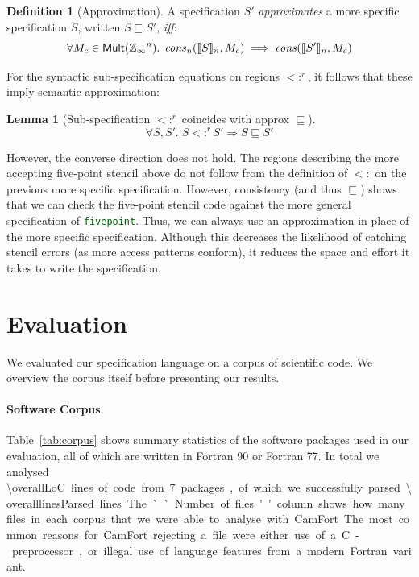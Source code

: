 \documentclass[9pt,preprint]{sigplanconf}
\newcounter{block}
\newtheorem{lemma}[block]{Lemma}
\theoremstyle{definition}
\newtheorem{definition}[block]{Definition}
\newcommand{\interp}[1]{\llbracket{#1}\rrbracket}
\newcommand{\term}[1]{\texttt{#1}}
\begin{document}
\begin{definition}[Approximation]
A specification $S'$
\emph{approximates} a more specific specification $S$, written 
$S \sqsubseteq S'$, \emph{iff}:
$$
\forall M_c \in \textsf{Mult}(\domainVal{}^n) . \;\, \mathit{cons}_n(\interp{S}_n,M_c) \implies
\mathit{cons}(\interp{S'}_n,M_c)
$$
\end{definition}
%
For the syntactic sub-specification equations on regions $<:^r$, it follows that
these imply semantic approximation:
%
\begin{lemma}[Sub-specification $<:^r$ coincides with approx 
$\sqsubseteq$]
\begin{equation*}
\forall S, S' . \; S <:^r S' \Rightarrow S \sqsubseteq S'
\end{equation*}
\end{lemma}
%
\noindent
However, the converse direction does not hold. 
The regions describing the more accepting five-point stencil
above do not follow from the definition of $<:$ on the previous
more specific specification.%
 However, consistency (and thus $\sqsubseteq$) shows
that we can check the five-point stencil code against the more general
specification of {\textcolor{darkgreen}{\term{fivepoint}}}. Thus, we
can always use an approximation in place of the
more specific specification. Although this decreases the likelihood of catching
stencil errors (as more access patterns conform), it reduces the space and
effort it takes to write the specification.

\section{Evaluation}
\label{sec:evaluation}
We evaluated our specification language on a corpus of scientific
code.  We overview the corpus itself before presenting our results.

\paragraph{Software Corpus}

Table~\ref{tab:corpus} shows summary statistics of the software
packages used in our evaluation, all of which are written in Fortran
90 or Fortran 77. In total we analysed \SI{\overallLoC} lines of code
from 7 packages, of which we successfully parsed
\SI{\overalllinesParsed} lines. The ``Number of files'' column shows
how many files in each corpus that we were able to analyse with
CamFort. The most common reasons for CamFort rejecting a file were
either use of a C-preprocessor, or illegal use of language features
from a modern Fortran variant.
\end{document}
